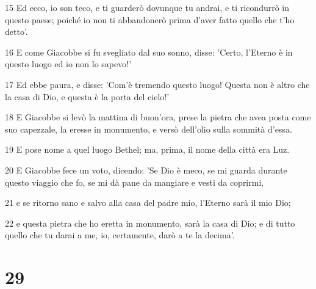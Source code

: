\par 15 Ed ecco, io son teco, e ti guarderò dovunque tu andrai, e ti ricondurrò in questo paese; poiché io non ti abbandonerò prima d'aver fatto quello che t'ho detto'.
\par 16 E come Giacobbe si fu svegliato dal suo sonno, disse: 'Certo, l'Eterno è in questo luogo ed io non lo sapevo!'
\par 17 Ed ebbe paura, e disse: 'Com'è tremendo questo luogo! Questa non è altro che la casa di Dio, e questa è la porta del cielo!'
\par 18 E Giacobbe si levò la mattina di buon'ora, prese la pietra che avea posta come suo capezzale, la eresse in monumento, e versò dell'olio sulla sommità d'essa.
\par 19 E pose nome a quel luogo Bethel; ma, prima, il nome della città era Luz.
\par 20 E Giacobbe fece un voto, dicendo: 'Se Dio è meco, se mi guarda durante questo viaggio che fo, se mi dà pane da mangiare e vesti da coprirmi,
\par 21 e se ritorno sano e salvo alla casa del padre mio, l'Eterno sarà il mio Dio;
\par 22 e questa pietra che ho eretta in monumento, sarà la casa di Dio; e di tutto quello che tu darai a me, io, certamente, darò a te la decima'.

\chapter{29}

